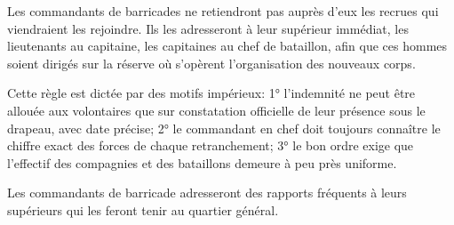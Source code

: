 \documentclass[french,twoside]{book} %
\begin{document}
Les commandants de barricades ne retiendront pas auprès d’eux les recrues qui viendraient les rejoindre. Ils les adresseront à leur supérieur immédiat, les lieutenants au capitaine, les capitaines au chef de bataillon, afin que ces hommes soient dirigés sur la réserve où s’opèrent l’organisation des nouveaux corps.\par
Cette règle est dictée par des motifs impérieux: 1° l’indemnité ne peut être allouée aux volontaires que sur constatation officielle de leur présence sous le drapeau, avec date précise; 2° le commandant en chef doit toujours connaître le chiffre exact des forces de chaque retranchement; 3° le bon ordre exige que l’effectif des compagnies et des bataillons demeure à peu près uniforme.\par
Les commandants de barricade adresseront des rapports fréquents à leurs supérieurs qui les feront tenir au quartier général.
\end{document}
